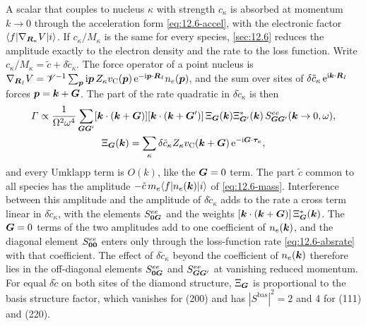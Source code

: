 A scalar that couples to nucleus $\kappa$ with strength $c_\kappa$ is absorbed at momentum $k \to 0$ through the acceleration form \cref{eq:12.6-accel}, with the electronic factor $\langle f|\nabla_{\bm{R}_\kappa}V|i\rangle$. If $c_\kappa/M_\kappa$ is the same for every species, \cref{sec:12.6} reduces the amplitude exactly to the electron density and the rate to the loss function. Write $c_\kappa/M_\kappa = \tilde c + \delta\tilde c_\kappa$. The force operator of a point nucleus is $\nabla_{\bm{R}_I}V = \mathscr{V}^{-1}\sum_{\bm{p}}\mathrm{i}\bm{p}\,Z_\kappa v_{\mathrm{C}}(\bm{p})\,\mathrm{e}^{-\mathrm{i}\bm{p}\cdot\bm{R}_I}n_e(\bm{p})$, and the sum over sites of $\delta\tilde c_\kappa\,\mathrm{e}^{\mathrm{i}\bm{k}\cdot\bm{R}_I}$ forces $\bm{p} = \bm{k} + \bm{G}$. The part of the rate quadratic in $\delta\tilde c_\kappa$ is then
\begin{equation}
  \begin{gathered}
  \varGamma \propto \frac{1}{\Omega^2\omega^4}\sum_{\bm{G}\bm{G}'}[\bm{k}\cdot(\bm{k}+\bm{G})][\bm{k}\cdot(\bm{k}+\bm{G}')]\,
  \Xi_{\bm{G}}(\bm{k})\Xi^*_{\bm{G}'}(\bm{k})\,S^{ee}_{\bm{G}\bm{G}'}(\bm{k}\to0,\omega) ,
  \\
  \Xi_{\bm{G}}(\bm{k}) = \sum_\kappa \delta\tilde c_\kappa Z_\kappa v_{\mathrm{C}}(\bm{k}+\bm{G})\,\mathrm{e}^{-\mathrm{i}\bm{G}\cdot\boldsymbol{\tau}_\kappa} ,
  \end{gathered}
  \label{eq:E.18-X}
\end{equation}
and every Umklapp term is $O(k)$, like the $\bm{G} = 0$ term. The part $\tilde c$ common to all species has the amplitude $-\tilde c\,m_e\langle f|n_e(\bm{k})|i\rangle$ of \cref{eq:12.6-mass}. Interference between this amplitude and the amplitude of $\delta\tilde c_\kappa$ adds to the rate a cross term linear in $\delta\tilde c_\kappa$, with the elements $S^{ee}_{\bm{0}\bm{G}}$ and the weights $[\bm{k}\cdot(\bm{k}+\bm{G})]\,\Xi^*_{\bm{G}}(\bm{k})$. The $\bm{G} = 0$ terms of the two amplitudes add to one coefficient of $n_e(\bm{k})$, and the diagonal element $S^{ee}_{\bm{0}\bm{0}}$ enters only through the loss-function rate \cref{eq:12.6-absrate} with that coefficient. The effect of $\delta\tilde c_\kappa$ beyond the coefficient of $n_e(\bm{k})$ therefore lies in the off-diagonal elements $S^{ee}_{\bm{0}\bm{G}}$ and $S^{ee}_{\bm{G}\bm{G}'}$ at vanishing reduced momentum. For equal $\delta\tilde c$ on both sites of the diamond structure, $\Xi_{\bm{G}}$ is proportional to the basis structure factor, which vanishes for (200) and has $|S^{\mathrm{bas}}|^2 = 2$ and 4 for (111) and (220).

